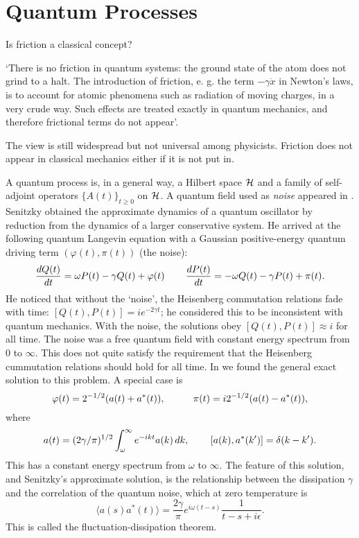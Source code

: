 \section{Quantum Processes}
Is friction a classical concept? 

`There is no
friction in quantum systems: the ground state of the atom does not grind
to a halt. The introduction of friction, e. g. the term
$-\gamma\dot{x}$ in Newton's laws, is to account for atomic phenomena
such as radiation of moving charges, in a very crude way. Such effects
are treated exactly in quantum mechanics, and therefore frictional terms
do not appear'. 

The view is still widespread but not universal among
physicists. Friction does not appear in classical mechanics either if
it is not put in.

A quantum process is, in a general way, a Hilbert space ${\cal H}$
and a family of self-adjoint operators $\{A(t)\}_{t\geq 0}$ on ${\cal H}$.
A quantum field used as {\em noise} appeared in
\cite{Senitzky}. Senitzky obtained
the approximate dynamics of a quantum oscillator by reduction
from the dynamics of a larger conservative system. He arrived at the
following quantum Langevin equation with a Gaussian positive-energy
quantum driving term $(\varphi(t),\pi(t))$ (the noise):
\begin{equation}
\frac{dQ(t)}{dt}=\omega P(t)-\gamma Q(t)+\varphi(t)\hspace{.3in}
\frac{dP(t)}{dt}=-\omega Q(t)-\gamma P(t)+\pi(t).
\end{equation}
He noticed that without the `noise', the Heisenberg commutation
relations fade with time: $[Q(t),P(t)]=ie^{-2\gamma t}$; he considered
this to be inconsistent with quantum mechanics. With the noise, the
solutions obey $[Q(t),P(t)]\approx i$ for all time. The noise
was a free quantum field with constant energy spectrum from $0$ to
$\infty$. This does not quite satisfy the requirement that the Heisenberg
cummutation relations should hold for all time. In \cite{RFS5}
we found the general exact solution to this problem.  A special case is
\[\varphi(t)=2^{-1/2}(a(t)+a^*(t)),\hspace{.4in}\pi(t)=i2^{-1/2}
(a(t)-a^*(t)),\]
where
\[a(t)=(2\gamma/\pi)^{1/2}\int_\omega^\infty e^{-ikt}a(k)\,dk,
\hspace{.3in}[a(k),a^*(k^\prime)]=\delta(k-k^\prime).\]
This has a constant energy spectrum from $\omega$ to $\infty$.
The feature of this solution, and Senitzky's approximate solution,
is the relationship between the dissipation $\gamma$ and the correlation
of the quantum noise, which at zero temperature is 
\[ \langle a(s)a^*(t)\rangle=\frac{2\gamma}{\pi}e^{i\omega(t-s)}\frac{1}{
t-s+i\epsilon}.\]
This is called the fluctuation-dissipation theorem.


